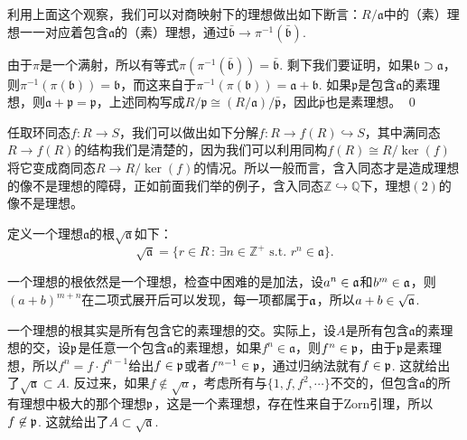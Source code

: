 \para 利用上面这个观察，我们可以对商映射下的理想做出如下断言：$R/\mathfrak{a}$中的（素）理想一一对应着包含$\mathfrak{a}$的（素）理想，通过$\bar{\mathfrak{b}}\to \pi^{-1}(\bar{\mathfrak{b}})$.

\proof 
	由于$\pi$是一个满射，所以有等式$\pi(\pi^{-1}(\bar{\mathfrak{b}}))=\bar{\mathfrak{b}}$. 剩下我们要证明，如果$\mathfrak{b}\supset \mathfrak{a}$，则$\pi^{-1}(\pi(\mathfrak{b}))=\mathfrak{b}$，而这来自于$\pi^{-1}(\pi(\mathfrak{b}))=\mathfrak{a}+\mathfrak{b}$. 如果$\mathfrak{p}$是包含$\mathfrak{a}$的素理想，则$\mathfrak{a}+\mathfrak{p}=\mathfrak{p}$，上述同构写成$R/\mathfrak{p}\cong (R/\mathfrak{a})/\bar{\mathfrak{p}}$，因此$\bar{\mathfrak{p}}$也是素理想。
\qed

\para 任取环同态$f:R\to S$，我们可以做出如下分解$f:R\to f(R)\hookrightarrow S$，其中满同态$R\to f(R)$的结构我们是清楚的，因为我们可以利用同构$f(R)\cong R/\ker(f)$将它变成商同态$R\to R/\ker(f)$的情况。所以一般而言，含入同态才是造成理想的像不是理想的障碍，正如前面我们举的例子，含入同态$\mathbb{Z}\hookrightarrow \mathbb{Q}$下，理想$(2)$的像不是理想。

\para 定义一个理想$\mathfrak{a}$的根$\sqrt{\mathfrak{a}}$如下：
\[
	\sqrt{\mathfrak{a}}=\{r\in R\,:\,\exists n\in \mathbb{Z}^+\text{ s.t. }r^n\in \mathfrak{a}\}.
\]

一个理想的根依然是一个理想，检查中困难的是加法，设$a^n\in \mathfrak{a}$和$b^m\in \mathfrak{a}$，则$(a+b)^{m+n}$在二项式展开后可以发现，每一项都属于$\mathfrak{a}$，所以$a+b\in \sqrt{\mathfrak{a}}$.

一个理想的根其实是所有包含它的素理想的交。实际上，设$A$是所有包含$\mathfrak{a}$的素理想的交，设$\mathfrak{p}$是任意一个包含$\mathfrak{a}$的素理想，如果$f^n\in \mathfrak{a}$，则$f^n\in \mathfrak{p}$，由于$\mathfrak{p}$是素理想，所以$f^n=f\cdot f^{n-1}$给出$f\in\mathfrak{p}$或者$f^{n-1}\in\mathfrak{p}$，通过归纳法就有$f\in \mathfrak{p}$. 这就给出了$\sqrt{\mathfrak{a}}\subset A$. 反过来，如果$f\not\in \sqrt{a}$，考虑所有与$\{1,f,f^2,\cdots\}$不交的，但包含$\mathfrak{a}$的所有理想中极大的那个理想$\mathfrak{p}$，这是一个素理想，存在性来自于Zorn引理，所以$f\not\in \mathfrak{p}$. 这就给出了$A\subset \sqrt{\mathfrak{a}}$.